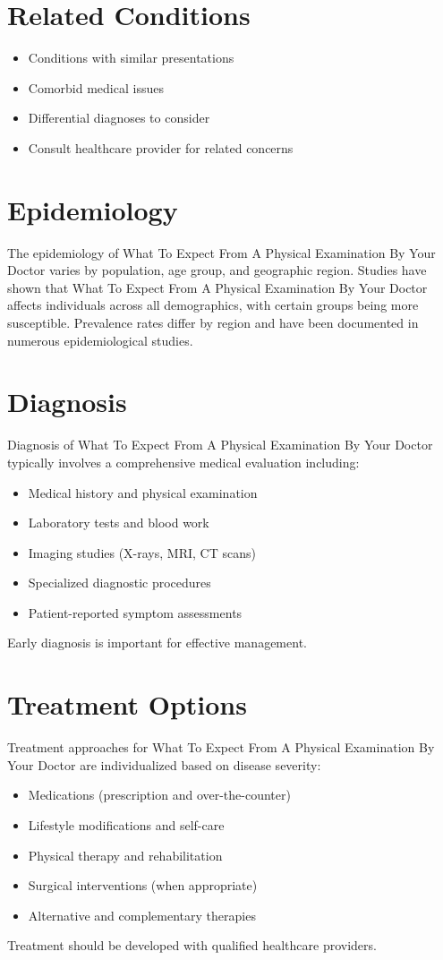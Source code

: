 \section*{Related Conditions}
\begin{itemize}
  \item Conditions with similar presentations
  \item Comorbid medical issues
  \item Differential diagnoses to consider
  \item Consult healthcare provider for related concerns
\end{itemize}

\section*{Epidemiology}
The epidemiology of What To Expect From A Physical Examination By Your Doctor varies by population, age group, and geographic region. Studies have shown that What To Expect From A Physical Examination By Your Doctor affects individuals across all demographics, with certain groups being more susceptible. Prevalence rates differ by region and have been documented in numerous epidemiological studies.

\section*{Diagnosis}
Diagnosis of What To Expect From A Physical Examination By Your Doctor typically involves a comprehensive medical evaluation including:
\begin{itemize}
  \item Medical history and physical examination
  \item Laboratory tests and blood work
  \item Imaging studies (X-rays, MRI, CT scans)
  \item Specialized diagnostic procedures
  \item Patient-reported symptom assessments
\end{itemize}
Early diagnosis is important for effective management.

\section*{Treatment Options}
Treatment approaches for What To Expect From A Physical Examination By Your Doctor are individualized based on disease severity:
\begin{itemize}
  \item Medications (prescription and over-the-counter)
  \item Lifestyle modifications and self-care
  \item Physical therapy and rehabilitation
  \item Surgical interventions (when appropriate)
  \item Alternative and complementary therapies
\end{itemize}
Treatment should be developed with qualified healthcare providers.

